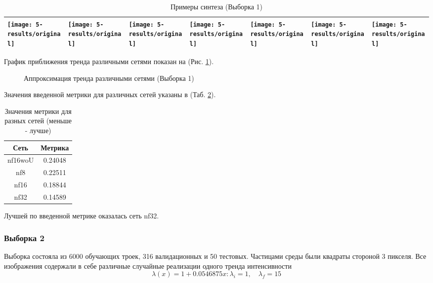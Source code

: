 \begin{table}[h!]
\begin{center}
\begin{tabular}{p{2cm} p{2cm} p{2cm} p{2cm} p{2cm} p{2cm} p{2cm}}
						\texttt{[image: 5-results/original]}
						&
						\texttt{[image: 5-results/original]}
						&
						\texttt{[image: 5-results/original]}
						&
						\texttt{[image: 5-results/original]}
						&
						\texttt{[image: 5-results/original]}
						&
						\texttt{[image: 5-results/original]}
						&
						\texttt{[image: 5-results/original]}
						\\
						\hline
					\end{tabular}
					\caption{Примеры синтеза (Выборка 1)}
					\label{8-dataset1-images}
				\end{center}
			\end{table}
			
			\break
			
			График приближения тренда различными сетями показан на (Рис. \ref{8-sand-trend2-results}).
			
			\begin{figure}[h!]
				\caption{Аппроксимация тренда различными сетями (Выборка 1)}
				\label{8-sand-trend2-results}
			\end{figure}
			
			Значения введенной метрики для различных сетей указаны в (Таб. \ref{8-sand-trend2-metrics}).
			
			\begin{table}[h!]
				\begin{center}
					\begin{tabular}{|c|c|}
						\hline
						Сеть & Метрика \\
						\hline
						nf16woU & 0.24048\\
						\hline
						nf8 & 0.22511\\
						\hline
						nf16 & 0.18844\\
						\hline
						nf32 & 0.14589\\
						\hline
					\end{tabular}
					\caption{Значения метрики для разных сетей (меньше - лучше)}
					\label{8-sand-trend2-metrics}
				\end{center}
			\end{table}
			
			Лучшей по введенной метрике оказалась сеть nf32.
		\subsubsection{Выборка 2}
			Выборка состояла из 6000 обучающих троек, 316 валидационных и 50 тестовых. Частицами среды были квадраты стороной 3 пикселя. Все изображения содержали в себе различные случайные реализации одного тренда интенсивности
			$$\lambda(x) = 1 + 0.0546875x: \lambda_i = 1, \quad \lambda_f = 15$$
			

